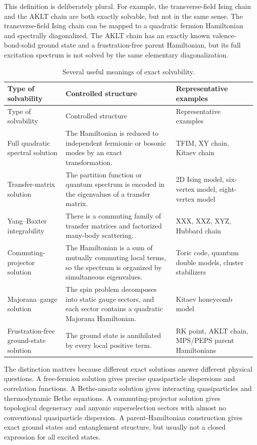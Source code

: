 This definition is deliberately plural.  For example, the transverse-field Ising chain and the AKLT chain are both exactly solvable, but not in the same sense.  The transverse-field Ising chain can be mapped to a quadratic fermion Hamiltonian and spectrally diagonalized.  The AKLT chain has an exactly known valence-bond-solid ground state and a frustration-free parent Hamiltonian, but its full excitation spectrum is not solved by the same elementary diagonalization.

\begin{longtable}{L{0.22\textwidth}L{0.43\textwidth}L{0.25\textwidth}}
\caption{Several useful meanings of exact solvability.}\label{tab:exact-solvability-meanings}\\
\toprule
Type of solvability & Controlled structure & Representative examples \\
\midrule
\endfirsthead
\toprule
Type of solvability & Controlled structure & Representative examples \\
\midrule
\endhead
Full quadratic spectral solution & The Hamiltonian is reduced to independent fermionic or bosonic modes by an exact transformation. & TFIM, XY chain, Kitaev chain \\
Transfer-matrix solution & The partition function or quantum spectrum is encoded in the eigenvalues of a transfer matrix. & 2D Ising model, six-vertex model, eight-vertex model \\
Yang--Baxter integrability & There is a commuting family of transfer matrices and factorized many-body scattering. & XXX, XXZ, XYZ, Hubbard chain \\
Commuting-projector solution & The Hamiltonian is a sum of mutually commuting local terms, so the spectrum is organized by simultaneous eigenvalues. & Toric code, quantum double models, cluster stabilizers \\
Majorana--gauge solution & The spin problem decomposes into static gauge sectors, and each sector contains a quadratic Majorana Hamiltonian. & Kitaev honeycomb model \\
Frustration-free ground-state solution & The ground state is annihilated by every local positive term. & RK point, AKLT chain, MPS/PEPS parent Hamiltonians \\
\bottomrule
\end{longtable}

The distinction matters because different exact solutions answer different physical questions.  A free-fermion solution gives precise quasiparticle dispersions and correlation functions.  A Bethe-ansatz solution gives interacting quasiparticles and thermodynamic Bethe equations.  A commuting-projector solution gives topological degeneracy and anyonic superselection sectors with almost no conventional quasiparticle dispersion.  A parent-Hamiltonian construction gives exact ground states and entanglement structure, but usually not a closed expression for all excited states.

